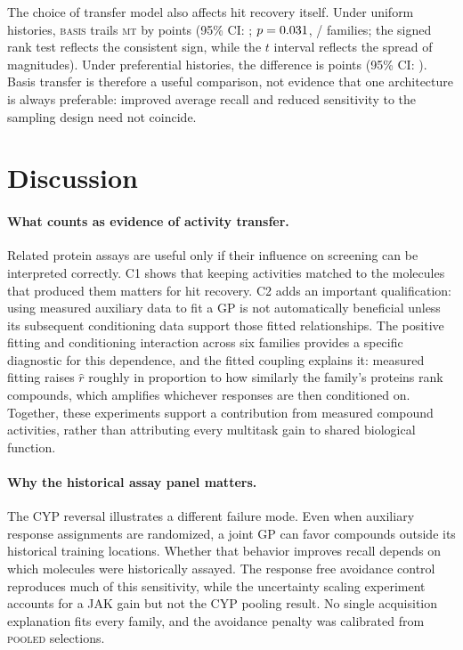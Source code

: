 \documentclass[10pt,letterpaper,runningheads]{llncs}
\newcommand{\mt}{\textsc{mt}}
\newcommand{\pooled}{\textsc{pooled}}
\newcommand{\basis}{\textsc{basis}}
\begin{document}
The choice of transfer model also affects hit recovery itself.
Under uniform histories, \basis{} trails \mt{} by
\decompBasisMinusMtUniform{} points (95\% CI:
\decompBasisMinusMtUniformCi{};
$p=0.031{}$,
\decompBasisMinusMtUniformPositive{}/\decompFamilies{} families; the
signed rank test reflects the consistent sign, while the $t$ interval
reflects the spread of magnitudes).
Under preferential histories, the difference is
\decompBasisMinusMtPreferential{} points (95\% CI:
\decompBasisMinusMtPreferentialCi{}). Basis transfer is therefore a
useful comparison, not evidence that one architecture is always
preferable: improved average recall and reduced sensitivity to the
sampling design need not coincide.

\section{Discussion}
\label{sec:discussion}

\paragraph{What counts as evidence of activity transfer.}
Related protein assays are useful only if their influence on screening
can be interpreted correctly. C1 shows that keeping activities matched
to the molecules that produced them matters for hit recovery. C2
adds an important qualification: using measured auxiliary data to fit
a GP is not automatically beneficial unless its subsequent
conditioning data support those fitted relationships. The positive
fitting and conditioning interaction across six families provides a
specific diagnostic for this dependence, and the fitted coupling
explains it: measured fitting raises $\hat r$ roughly in proportion to
how similarly the family's proteins rank compounds, which amplifies
whichever responses are then conditioned on. Together, these experiments
support a contribution from measured compound activities, rather than
attributing every multitask gain to shared biological function.

\paragraph{Why the historical assay panel matters.}
The CYP reversal illustrates a different failure mode. Even when
auxiliary response assignments are randomized, a joint GP can
favor compounds outside its historical training locations. Whether
that behavior improves recall depends on which molecules were
historically assayed. The response free avoidance control reproduces
much of this sensitivity, while the uncertainty scaling experiment
accounts for a JAK gain but not the CYP pooling result. No single
acquisition explanation fits every family, and the avoidance penalty
was calibrated from \pooled{} selections.
\end{document}
